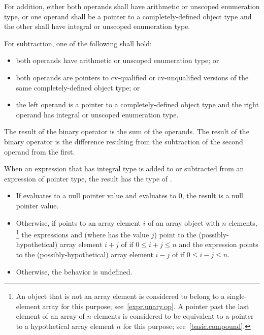 %
For addition, either both operands shall have arithmetic or unscoped enumeration
type, or one operand shall be a pointer to a completely-defined object
type and the other shall have integral or unscoped enumeration type.

\pnum
For subtraction, one of the following shall hold:
\begin{itemize}
\item both operands have arithmetic or unscoped enumeration type; or

%
\item both operands are pointers to cv-qualified or cv-unqualified
versions of the same completely-defined object type; or

\item the left operand is a pointer to a completely-defined object type
and the right operand has integral or unscoped enumeration type.
\end{itemize}

\pnum
The result of the binary \tcode{+} operator is the sum of the operands.
The result of the binary \tcode{-} operator is the difference resulting
from the subtraction of the second operand from the first.

\pnum
{}%
When an expression  that has integral type
is added to or subtracted from an expression  of pointer type,
the result has the type of .
\begin{itemize}
\item If  evaluates to a null pointer value and
 evaluates to 0, the result is a null pointer value.
\item Otherwise, if  points to an array element $i$
of an array object  with $n$ elements,%
\footnote{An object that is not an array element is considered to belong to a
single-element array for this purpose; see~\ref{expr.unary.op}.
A pointer past the last element of an array  of $n$ elements
is considered to be equivalent to a pointer to a hypothetical array element
$n$ for this purpose; see~\ref{basic.compound}.}
the expressions  and 
(where  has the value $j$)
point to the (possibly-hypothetical) array element
$i + j$ of  if $0 \le i + j \le n$
and the expression 
points to the (possibly-hypothetical) array element
$i - j$ of  if $0 \le i - j \le n$.
\item Otherwise, the behavior is undefined.
\end{itemize}

